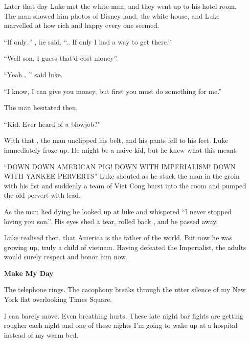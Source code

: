 Later that day Luke met the white man, and they went up to his
hotel room. The man showed him photos of Disney land, the white
house, and Luke marvelled at how rich and happy every one
seemed.



``If only..'' , he said, ``.. If only I had a way to get
there.''.



``Well son, I guess that'd cost money''.



``Yeah{\ldots} '' said luke.



``I know, I can give you money, but first you must do something for
me.''



The man hesitated then,



``Kid. Ever heard of a blowjob?''



With that , the man unclipped his belt, and his pants fell to his
feet. Luke immediately froze up. He might be a naive kid, but he
knew what this meant.



``DOWN DOWN AMERICAN PIG! DOWN WITH IMPERIALISM! DOWN WITH YANKEE
PERVERTS'' Luke shouted as he stuck the man in the groin with his
fist and suddenly a team of Viet Cong burst into the room and
pumped the old pervert with lead.



As the man lied dying he looked up at luke and whispered ``I never
stopped loving you son.''. His eyes shed a tear, rolled back , and
he passed away.



Luke realised then, that America is the father of the world. But
now he was growing up, truly a child of vietnam. Having defeated
the Imperialist, the adults would surely respect and honor him now.

 





{\bf Make My Day}



The telephone rings. The cacophony breaks through the utter silence
of my New York flat overlooking Times Square.



I can barely move. Even breathing hurts. These late night bar
fights are getting rougher each night and one of these nights
I'm going to wake up at a hospital instead of my warm
bed.



